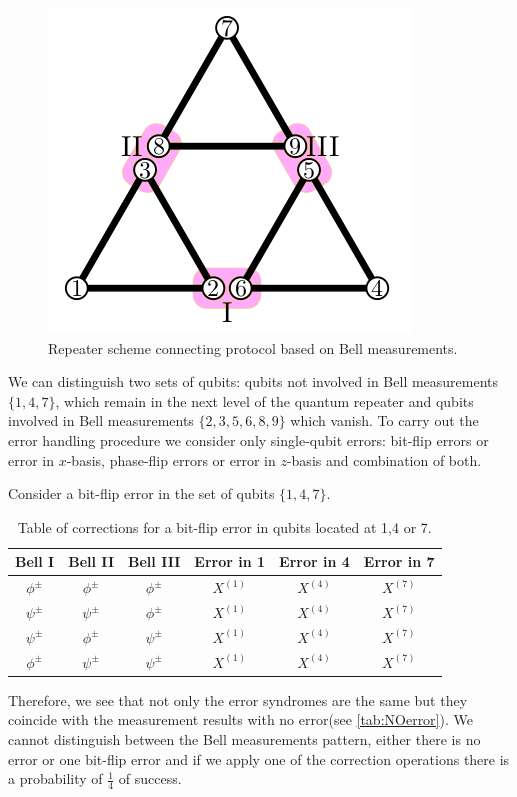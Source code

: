 \documentclass[10pt,a4paper]{book}
\numberwithin{equation}{chapter}
\numberwithin{figure}{chapter}
\numberwithin{table}{chapter}
\begin{document}
\begin{figure}[H]
    \begin{center}
        \includegraphics[scale=0.4]{GHZ3.png}
    \end{center}
    \caption{\footnotesize Repeater scheme connecting protocol based on Bell measurements.}
    \label{GHZ3}
\end{figure}

We can distinguish two sets of qubits: qubits not involved in Bell measurements $\lbrace 1,4,7 \rbrace$, which remain in the next level of the quantum repeater and qubits involved in Bell measurements $\lbrace 2,3,5,6,8,9 \rbrace$ which vanish. To carry out the error handling procedure we consider only single-qubit errors: bit-flip errors or error in $x$-basis, phase-flip errors or error in $z$-basis and combination of both. 

Consider a bit-flip error in the set of qubits $\lbrace 1,4,7 \rbrace$.
\begin{table}[H]
    \centering
    \begin{tabular}{|c c c|c|c|c|}
    \hline
    Bell I & Bell II & Bell III & Error in 1 & Error in 4 & Error in 7 \\
    \hline
  $\phi^{\pm}$&$\phi^{\pm}$&$\phi^{\pm}$&$X^{(1)}$&$X^{(4)}$ &$X^{(7)}$\\
  $\psi^{\pm}$&$\psi^{\pm}$&$\phi^{\pm}$&$X^{(1)}$&$X^{(4)}$ &$X^{(7)}$\\
  $\psi^{\pm}$&$\phi^{\pm}$&$\psi^{\pm}$&$X^{(1)}$&$X^{(4)}$ &$X^{(7)}$\\
  $\phi^{\pm}$&$\psi^{\pm}$&$\psi^{\pm}$&$X^{(1)}$&$X^{(4)}$ &$X^{(7)}$\\
    \hline
    \end{tabular}
	\caption{\footnotesize Table of corrections for a bit-flip error in qubits located at 1,4 or 7.}
	\label{tab:Error147}
\end{table}
Therefore, we see that not only the error syndromes are the same but they coincide with the measurement results with no error(see \autoref{tab:NOerror}). We cannot distinguish between the Bell measurements pattern, either there is no error or one bit-flip error and if we apply one of the correction operations there is a probability of $\frac{1}{4}$ of success.
\end{document}
